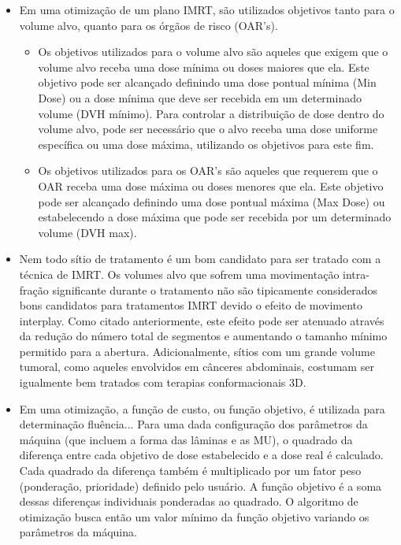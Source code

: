 \documentclass[11pt,a4paper]{article}
\newcounter{exemplo}
\begin{document}
\begin{exemplo}
\begin{itemize}
        \item Em uma otimização de um plano IMRT, são utilizados objetivos tanto para o volume alvo, quanto para os órgãos de risco (OAR's). 
        
            \begin{itemize}[label=\textcolor{CarnationPink}{\textopenbullet}]
                \item  Os objetivos utilizados para o volume alvo são aqueles que exigem que o volume alvo receba uma dose mínima ou doses maiores que ela. Este objetivo pode ser alcançado definindo uma dose pontual mínima (Min Dose) ou a dose mínima que deve ser recebida em um determinado volume (DVH mínimo). Para controlar a distribuição de dose dentro do volume alvo, pode ser necessário que o alvo receba uma dose uniforme específica ou uma dose máxima, utilizando os objetivos para este fim.
                
                \item Os objetivos utilizados para os OAR's são aqueles que requerem que o OAR receba uma dose máxima ou doses menores que ela. Este objetivo pode ser alcançado definindo uma dose pontual máxima (Max Dose) ou estabelecendo a dose máxima que pode ser recebida por um determinado volume (DVH max).
            \end{itemize}

        \item Nem todo sítio de tratamento é um bom candidato para ser tratado com a técnica de IMRT. Os volumes alvo que sofrem uma movimentação intra-fração significante durante o tratamento não são tipicamente considerados bons candidatos para tratamentos IMRT devido o efeito de movimento interplay. Como citado anteriormente, este efeito pode ser atenuado através da redução do número total de segmentos e aumentando o tamanho mínimo permitido para a abertura. Adicionalmente, sítios com um grande volume tumoral, como aqueles envolvidos em cânceres abdominais, costumam ser igualmente bem tratados com terapias conformacionais 3D.
        
        \item Em uma otimização, a função de custo, ou função objetivo, é utilizada para determinação fluência... Para uma dada configuração dos parâmetros da máquina (que incluem a forma das lâminas e as MU), o quadrado da diferença entre cada objetivo de dose estabelecido e a dose real é calculado. Cada quadrado da diferença também é multiplicado por um fator peso (ponderação, prioridade) definido pelo usuário. A função objetivo é a soma dessas diferenças individuais ponderadas ao quadrado. O algoritmo de otimização busca então um valor mínimo da função objetivo variando os parâmetros da máquina. 


\end{itemize}
\end{exemplo}
\end{document}
